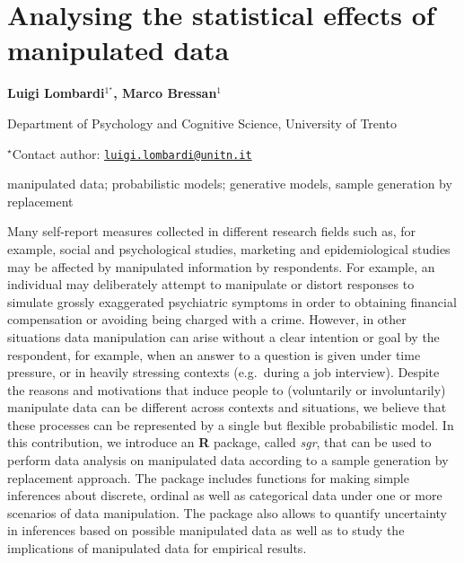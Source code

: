 \documentclass[\main/boa.tex]{subfiles}
\begin{document}
\pagestyle{empty}

\section{Analysing the statistical effects of manipulated data}

\begin{center}
  {\bf Luigi Lombardi$^{1^\star}$, Marco Bressan$^{1}$}
\end{center}

\vskip 0.3cm

\begin{affiliations}
\begin{enumerate}
\begin{minipage}{0.915\textwidth}
\centering
\item Department of Psychology and Cognitive Science, University of Trento \\[-2pt]
\end{minipage}
\end{enumerate}
$^\star$Contact author: \href{mailto:luigi.lombardi@unitn.it}{\nolinkurl{luigi.lombardi@unitn.it}}\\
\end{affiliations}

\vskip 0.5cm

\begin{minipage}{0.915\textwidth}
\keywords manipulated data; probabilistic models; generative models, sample
generation by replacement
\end{minipage}

\vskip 0.8cm

Many self-report measures collected in different research fields such
as, for example, social and psychological studies, marketing and
epidemiological studies may be affected by manipulated information by
respondents. For example, an individual may deliberately attempt to
manipulate or distort responses to simulate grossly exaggerated
psychiatric symptoms in order to obtaining financial compensation or
avoiding being charged with a crime. However, in other situations data
manipulation can arise without a clear intention or goal by the
respondent, for example, when an answer to a question is given under
time pressure, or in heavily stressing contexts (e.g.~during a job
interview). Despite the reasons and motivations that induce people to
(voluntarily or involuntarily) manipulate data can be different across
contexts and situations, we believe that these processes can be
represented by a single but flexible probabilistic model. In this
contribution, we introduce an \textbf{R} package, called \emph{sgr},
that can be used to perform data analysis on manipulated data according
to a sample generation by replacement approach. The package includes
functions for making simple inferences about discrete, ordinal as well
as categorical data under one or more scenarios of data manipulation.
The package also allows to quantify uncertainty in inferences based on
possible manipulated data as well as to study the implications of
manipulated data for empirical results.
\end{document}
